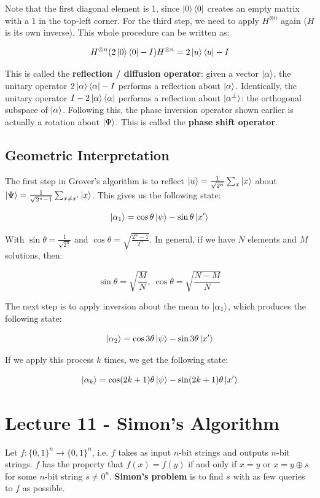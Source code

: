 \documentclass[12pt]{article}
\begin{document}
\noindent
Note that the first diagonal element is 1, since $\ket{0}\bra{0}$ creates an empty matrix with a 1 in the top-left corner.
For the third step, we need to apply $H^{\otimes n}$ again ($H$ is its own inverse).
This whole procedure can be written as:

\[ H^{\otimes n} (2\ket{0}\bra{0} - I) H^{\otimes n} = 2\ket{u}\bra{u} - I \]

\noindent
This is called the \textbf{reflection / diffusion operator}: given a vector $\ket{\alpha}$, the unitary operator $2\ket{\alpha}\bra{\alpha} - I$ performs a reflection about $\ket{\alpha}$.
Identically, the unitary operator $I - 2\ket{\alpha}\bra{\alpha}$ performs a reflection about $\ket{\alpha^\perp}$: the orthogonal subspace of $\ket{\alpha}$.
Following this, the phase inversion operator shown earlier is actually a rotation about $\ket{\Psi}$.
This is called the \textbf{phase shift operator}.

\subsection*{Geometric Interpretation}
The first step in Grover's algorithm is to reflect $\ket{u} = \frac{1}{\sqrt{2^n}} \sum_x \ket{x}$ about $\ket{\Psi} = \frac{1}{\sqrt{2^n - 1}} \sum_{x \neq x^\prime} \ket{x}$.
This gives us the following state:

\[ \ket{\alpha_1} = \cos \theta \ket{\psi} - \sin \theta \ket{x^\prime} \]

\noindent
With $\sin \theta = \frac{1}{\sqrt{2^n}}$ and $\cos \theta = \sqrt{\frac{2^n - 1}{2^n}}$.
In general, if we have $N$ elements and $M$ solutions, then:

\[ \sin \theta = \sqrt{\frac{M}{N}}, \ \cos \theta = \sqrt{\frac{N - M}{N}} \]

\noindent
The next step is to apply inversion about the mean to $\ket{\alpha_1}$, which produces the following state:

\[ \ket{\alpha_2} = \cos 3\theta \ket{\psi} - \sin 3\theta \ket{x^\prime} \]

\noindent
If we apply this process $k$ times, we get the following state:

\[ \ket{\alpha_k} = \cos (2k + 1) \theta \ket{\psi} - \sin (2k + 1) \theta \ket{x^\prime} \]

%
%
\newpage
\section*{Lecture 11 - Simon's Algorithm}
Let $f: \{ 0, 1 \}^n \rightarrow \{ 0, 1 \}^n$, i.e. $f$ takes as input $n$-bit strings and outputs $n$-bit strings.
$f$ has the property that $f(x) = f(y)$ if and only if $x = y$ or $x = y \oplus s$ for some $n$-bit string $s \neq 0^n$.
\textbf{Simon's problem} is to find $s$ with as few queries to $f$ as possible.
\end{document}
